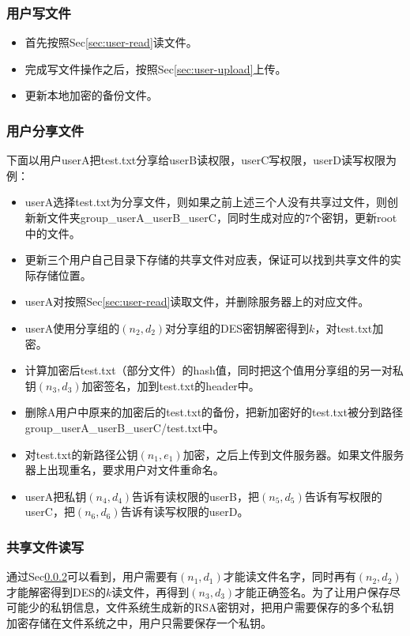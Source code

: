 \documentclass[11pt, oneside]{ctexart}
\begin{document}
\subsubsection{用户写文件}
\begin{itemize}
\item 首先按照Sec\ref{sec:user-read}读文件。
\item 完成写文件操作之后，按照Sec\ref{sec:user-upload}上传。
\item 更新本地加密的备份文件。
\end{itemize}

\subsubsection{用户分享文件}\label{sec:share}
下面以用户userA把test.txt分享给userB读权限，userC写权限，userD读写权限为例：
\begin{itemize}
\item userA选择test.txt为分享文件，则如果之前上述三个人没有共享过文件，则创新新文件夹group\_userA\_userB\_userC，同时生成对应的$7$个密钥，更新root中的文件。
\item 更新三个用户自己目录下存储的共享文件对应表，保证可以找到共享文件的实际存储位置。
\item userA对按照Sec\ref{sec:user-read}读取文件，并删除服务器上的对应文件。
\item userA使用分享组的$(n_2, d_2)$对分享组的DES密钥解密得到$k$，对test.txt加密。
\item 计算加密后test.txt（部分文件）的hash值，同时把这个值用分享组的另一对私钥$(n_3, d_3)$加密签名，加到test.txt的header中。
\item 删除A用户中原来的加密后的test.txt的备份，把新加密好的test.txt被分到路径group\_userA\_userB\_userC/test.txt中。
\item 对test.txt的新路径公钥$(n_1, e_1)$加密，之后上传到文件服务器。如果文件服务器上出现重名，要求用户对文件重命名。
\item userA把私钥$(n_4, d_4)$告诉有读权限的userB，把$(n_5, d_5)$告诉有写权限的userC，把$(n_6, d_6)$告诉有读写权限的userD。
\end{itemize}

\subsubsection{共享文件读写}
通过Sec\ref{sec:share}可以看到，用户需要有$(n_1, d_1)$才能读文件名字，同时再有$(n_2, d_2)$才能解密得到DES的$k$读文件，再得到$(n_3, d_3)$才能正确签名。为了让用户保存尽可能少的私钥信息，文件系统生成新的RSA密钥对，把用户需要保存的多个私钥加密存储在文件系统之中，用户只需要保存一个私钥。
\end{document}
